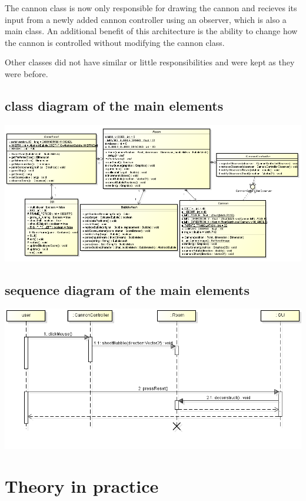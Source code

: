 \documentclass[a4paper]{article}
\begin{document}
The cannon class is now only responsible for drawing the cannon and recieves its input from a newly added cannon controller using an observer, which is also a main class. An additional benefit of this architecture is the ability to change how the cannon is controlled without modifying the cannon class.

Other classes did not have similar or little responsibilities and were kept as they were before.

\subsection{class diagram of the main elements}
\includegraphics[width=1\textwidth]{main_classes_diagram_v2_picture.PNG}

\subsection{sequence diagram of the main elements}
\includegraphics[width=1\textwidth]{AAAAA_plaatje.PNG}

\section{Theory in practice}
\end{document}
